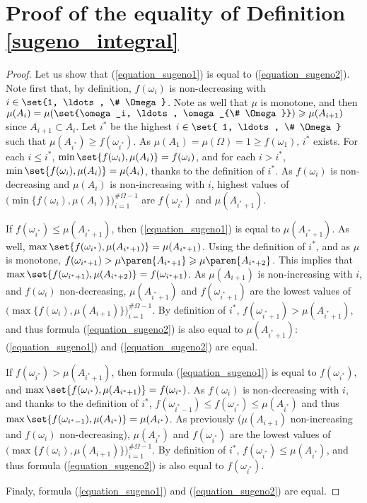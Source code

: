 \section{Proof of the equality of Definition \ref{sugeno_integral}}
\begin{proof}
Let us show that (\ref{equation_sugeno1}) is equal to (\ref{equation_sugeno2}).
Note first that, by definition, $f(\omega_i)$ is non-decreasing with $i \in \set{1, \ldots, \# \Omega}$.
Note as well that $\mu$ is monotone, and then $\mu(A_i) = \mu( \set{\omega_i, \ldots, \omega_{\# \Omega}} ) \geqslant \mu(A_{i+1})$
since $A_{i+1} \subset A_i$.
Let $i^*$ be the highest $i \in \set{ 1, \ldots, \# \Omega }$ such that $\mu(A_{i^*}) \geqslant f(\omega_{i^*})$.
As $\mu(A_1) = \mu(\Omega) = 1 \geqslant f(\omega_1)$, $i^*$ exists. 
For each $i \leqslant i^*$, $\min \set{ f(\omega_i), \mu(A_i) } = f(\omega_i)$,
and for each $i > i^*$, $\min \set{ f(\omega_i), \mu(A_i) } = \mu(A_i)$,
thanks to the definition of $i^*$.
As $f(\omega_i)$ is non-decreasing and $\mu(A_i)$ is non-increasing with $i$,
highest values of $\Big( \displaystyle \min \big\{ f(\omega_i), \mu(A_i) \big\} \Big)_{i=1}^{\# \Omega-1}$
are $f(\omega_{i^*})$ and $\mu(A_{i^*+1})$.

If $f(\omega_{i^*}) \leqslant \mu(A_{i^*+1})$, then
 (\ref{equation_sugeno1}) is equal to $\mu(A_{i^*+1})$.
As well, $\max \set{f(\omega_{i^*}), \mu(A_{i^*+1})} = \mu(A_{i^*+1})$.
Using the definition of $i^*$, and as $\mu$ is monotone, 
$f(\omega_{i^*+1}) > \mu \paren{ A_{i^*+1}} \geqslant \mu \paren{ A_{i^*+2} }$.
This implies that $\max \set{f(\omega_{i^*+1}), \mu(A_{i^*+2})} = f(\omega_{i^*+1})$.
As $\mu(A_{i+1})$ is non-increasing with $i$, and $f(\omega_i)$ non-decreasing,
$\mu(A_{i^*+1})$ and $f(\omega_{i^*+1})$ are the lowest values of 
$\Big( \displaystyle \max \big\{ f(\omega_i), \mu(A_{i+1}) \big\} \Big)_{i=1}^{\# \Omega-1}$.
By definition of $i^*$, $f(\omega_{i^*+1})>\mu(A_{i^*+1})$, 
and thus formula (\ref{equation_sugeno2})
is also equal to $\mu(A_{i^*+1})$: (\ref{equation_sugeno1}) and (\ref{equation_sugeno2}) are equal.

If $f(\omega_{i^*}) > \mu(A_{i^*+1})$,
then formula (\ref{equation_sugeno1}) is equal to $f(\omega_{i^*})$,
and $\max \set{ f(\omega_{i^*}), \mu(A_{i^*+1}) } = f(\omega_{i^*})$.
As $f(\omega_i)$ is non-decreasing with $i$, and thanks to the definition of $i^*$,
$f(\omega_{i^*-1}) \leqslant f(\omega_{i^*}) \leqslant \mu(A_{i^*})$
and thus $\max \set{ f(\omega_{i^*-1}), \mu(A_{i^*}) } = \mu(A_{i^*})$.
As previously ($\mu(A_{i+1})$ non-increasing and $f(\omega_i)$ non-decreasing),
$\mu(A_{i^*})$ and $f(\omega_{i^*})$ are the lowest values of 
$\Big( \displaystyle \max \big\{ f(\omega_i), \mu(A_{i+1}) \big\} \Big)_{i=1}^{\# \Omega-1}$.
By definition of $i^*$, $f(\omega_{i^*})\leqslant\mu(A_{i^*})$, 
and thus formula (\ref{equation_sugeno2})
is also equal to $f(\omega_{i^*})$. 

Finaly, formula (\ref{equation_sugeno1}) and (\ref{equation_sugeno2}) are equal.
\end{proof}









